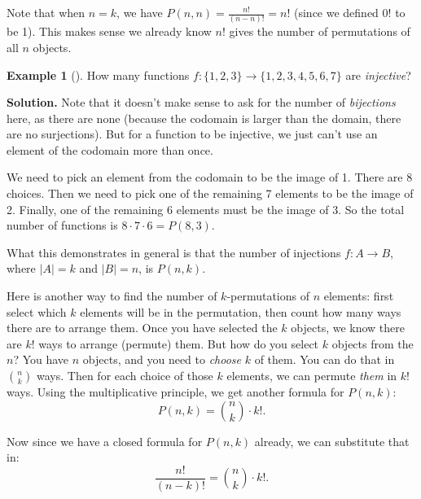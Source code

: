 \documentclass[10pt,]{book}
\theoremstyle{plain}
\theoremstyle{definition}
\newtheorem{example}[theorem]{Example}
\theoremstyle{definition}
\theoremstyle{definition}
\numberwithin{equation}{section}
\newcommand{\card}[1]{\left| #1 \right|}
\begin{document}
        Note that when \(n = k\), we have \(P(n,n) = \frac{n!}{(n-n)!} = n!\) (since we defined \(0!\) to be 1). This makes sense
        \textemdash{}we already know \(n!\) gives the number of permutations of all \(n\) objects.
\begin{example}[]\label{example-33}
How many functions \(f:\{1,2,3\} \to \{1,2,3,4,5,6,7\}\) are \emph{injective}?%
\par\medskip\noindent%
\textbf{Solution.}\quad 
            Note that it doesn't make sense to ask for the number of \emph{bijections} here, as there are none (because the codomain is larger than the domain, there are no surjections). But for a function to be injective, we just can't use an element of the codomain more than once.
\par

            We need to pick an element from the codomain to be the image of 1. There are 8 choices. Then we need to pick one of the remaining 7 elements to be the image of 2. Finally, one of the remaining 6 elements must be the image of 3. So the total number of functions is \(8\cdot 7 \cdot 6 = P(8,3)\).
\par

            What this demonstrates in general is that the number of injections \(f:A \to B\), where \(\card{A} = k\) and \(\card{B} = n\), is \(P(n,k)\).
\end{example}
\par

          Here is another way to find the number of \(k\)-permutations of \(n\) elements: first select which \(k\) elements will be in the permutation, then count how many ways there are to arrange them. Once you have selected the \(k\) objects, we know there are \(k!\) ways to arrange (permute) them. But how do you select \(k\) objects from the \(n\)? You have \(n\) objects, and you need to \emph{choose} \(k\) of them. You can do that in \({n \choose k}\) ways. Then for each choice of those \(k\) elements, we can permute \emph{them} in \(k!\) ways. Using the multiplicative principle, we get another formula for \(P(n,k)\):
          \begin{equation*}
            P(n,k) = {n \choose k}\cdot k!.
          \end{equation*}
\par

          Now since we have a closed formula for \(P(n,k)\) already, we can substitute that in:
          \begin{equation*}
            \frac{n!}{(n-k)!} = {n \choose k} \cdot k!.
          \end{equation*}
\par
\end{document}
